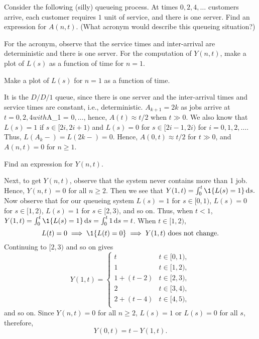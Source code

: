  \begin{exercise}  
Consider the following (silly) queueing process.
 At times $0, 2,4, \ldots$ customers arrive, each customer requires $1$ unit of service, and there is one server.
 Find an expression for $A(n,t)$.
 (What acronym would describe this queueing situation?)
\begin{hint}
 For the acronym, observe that the service times and inter-arrival are deterministic and there is one server.
 For the computation of $Y(n,t)$, make a plot of $L(s)$ as a function of time for $n=1$.

 Make a plot of $L(s)$ for $n=1$ as a function of time.
\end{hint}
\begin{solution}
 It is the $D/D/1$ queue, since there is one server and the inter-arrival times and service times are constant, i.e., deterministic.
 $A_{k+1} = 2k$ as jobs arrive at $t=0, 2, 4 with $A_1 = 0$, \ldots$, hence, $A(t) \approx t/2$ when $t\gg 0$.
 We also know that $L(s)=1$ if $s\in [2i, 2i+1)$ and $L(s)=0$ for $s\in[2i-1, 2i)$ for $i=0, 1, 2, \ldots$.
 Thus, $L(A_k-) = L(2k-)=0$.
 Hence, $A(0,t) \approx t/2$ for $t\gg 0$, and $A(n,t)=0$ for $n\geq 1$.
\end{solution}
\end{exercise}


\begin{exercise}  
 Find an expression for $Y(n,t)$.
\begin{solution}
 Next, to get $Y(n,t)$, observe that the system never contains
 more than 1 job. Hence, $Y(n,t)=0$ for all $n\geq 2$. Then we see that
 $Y(1,t) = \int_0^t \1{L(s) = 1}\d s.$ Now observe that for our
 queueing system $L(s)=1$ for $s\in[0,1)$, $L(s)=0$ for
 $s\in[1,2)$, $L(s)=1$ for $s\in[2,3)$, and so on. Thus, when
 $t<1$, $Y(1,t)=\int_0^t \1{L(s)=1} \d s = \int_0^t 1\d s = t$.
 When $t\in[1,2)$, 
 \begin{equation*}
 L(t)=0 \implies \1{L(t)=0} \implies Y(1,t) \text{ does not change}.
 \end{equation*}
Continuing to $[2,3)$ and so on gives
 \begin{equation*}
 Y(1,t) =
 \begin{cases}
 t & t\in[0,1), \\
 1 & t\in[1,2), \\
 1+(t-2) & t\in[2,3), \\
 2 & t\in[3,4), \\
 2+(t-4) & t\in[4,5), \\
 \end{cases}
 \end{equation*}
 and so on. Since $Y(n,t)=0$ for all $n\geq 2$, $L(s) = 1$ or
 $L(s)=0$ for all $s$, therefore, 
 \begin{equation*}
 Y(0,t) = t-Y(1,t).
 \end{equation*}
\end{solution}
\end{exercise}


